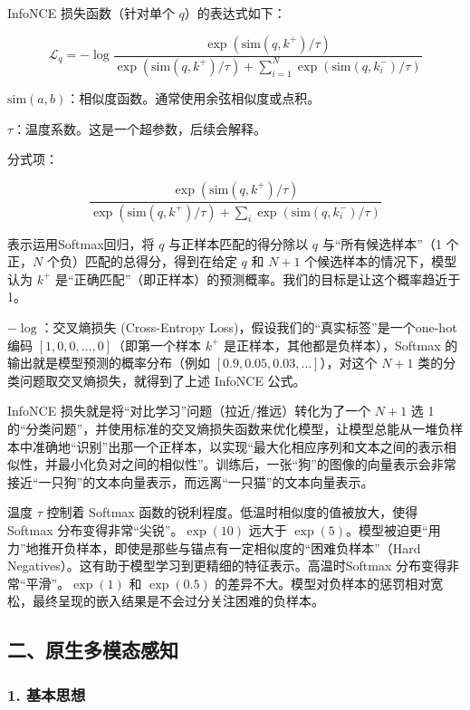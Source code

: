 InfoNCE 损失函数（针对单个 \(q\)）的表达式如下：

\[
\mathcal{L}_q=-\log \frac{\exp(\mathrm{sim}(q,k^+)/\tau)}
{\exp(\mathrm{sim}(q,k^+)/\tau)+\sum_{i=1}^{N}\exp(\mathrm{sim}(q,k_i^-)/\tau)}
\]

\(\mathrm{sim}(a,b)\)：相似度函数。通常使用余弦相似度或点积。

\(\tau\)：温度系数。这是一个超参数，后续会解释。

分式项：

\[
\frac{\exp(\mathrm{sim}(q,k^+)/\tau)}
{\exp(\mathrm{sim}(q,k^+)/\tau)+\sum_i\exp(\mathrm{sim}(q,k_i^-)/\tau)}
\]

表示运用Softmax回归，将 \(q\) 与正样本匹配的得分除以 \(q\) 与``所有候选样本''（1 个正，\(N\) 个负）匹配的总得分，得到在给定 \(q\) 和 \(N+1\) 个候选样本的情况下，模型认为 \(k^+\) 是``正确匹配''（即正样本）的预测概率。我们的目标是让这个概率趋近于 1。

\(-\log\)：交叉熵损失 (Cross-Entropy Loss)，假设我们的``真实标签''是一个one-hot编码 \([1,0,0,\ldots,0]\)（即第一个样本 \(k^+\) 是正样本，其他都是负样本），Softmax 的输出就是模型预测的概率分布（例如 \([0.9,0.05,0.03,\ldots]\)），对这个 \(N+1\) 类的分类问题取交叉熵损失，就得到了上述 InfoNCE 公式。

InfoNCE 损失就是将``对比学习''问题（拉近/推远）转化为了一个 \(N+1\) 选 1 的``分类问题''，并使用标准的交叉熵损失函数来优化模型，让模型总能从一堆负样本中准确地``识别''出那一个正样本，以实现``最大化相应序列和文本之间的表示相似性，并最小化负对之间的相似性''。训练后，一张``狗''的图像的向量表示会非常接近``一只狗''的文本向量表示，而远离``一只猫''的文本向量表示。

温度 \(\tau\) 控制着 Softmax 函数的锐利程度。低温时相似度的值被放大，使得 Softmax 分布变得非常``尖锐''。\(\exp(10)\) 远大于 \(\exp(5)\)。模型被迫更``用力''地推开负样本，即使是那些与锚点有一定相似度的``困难负样本''（Hard Negatives）。这有助于模型学习到更精细的特征表示。高温时Softmax 分布变得非常``平滑''。\(\exp(1)\) 和 \(\exp(0.5)\) 的差异不大。模型对负样本的惩罚相对宽松，最终呈现的嵌入结果是不会过分关注困难的负样本。

\hypertarget{ux4e8cux539fux751fux591aux6a21ux6001ux611fux77e5}{%
\subsection{二、原生多模态感知}\label{ux4e8cux539fux751fux591aux6a21ux6001ux611fux77e5}}

\hypertarget{ux57faux672cux601dux60f3-1}{%
\subsubsection{1. 基本思想}\label{ux57faux672cux601dux60f3-1}}

